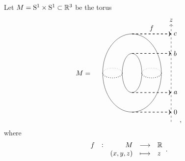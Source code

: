 \begin{example}
Let $ M = \mathrm{S}^1 \times \mathrm{S}^1 \subset \mathbb{R}^3 $ be the torus
$$
\begin{tikzpicture}
\draw (-2.5, 0) node{$ M = $};
\draw (0, 0) ellipse (1.5 and 2);
\draw (0, 0) ellipse (0.5 and 1);
\draw [dotted, thick] (-1.5, 0) arc (-180:0:0.5 and 0.25);
\draw [dotted, thick] (0.5, 0) arc (-180:0:0.5 and 0.25);
\draw [dotted] (-1.5, 0) arc (180:0:0.5 and 0.25);
\draw [dotted] (0.5, 0) arc (180:0:0.5 and 0.25);
\draw [->, dashed] (2, -2.5) to (2, 2.5) node[above]{$ z $};
\draw (1, 2) node[above]{$ f $};
\draw [->, dashed, thick] (0, -2) to (2, -2) node[right]{$ 0 $};
\draw [->, dashed, thick] (0, -1) to (2, -1) node[right]{$ a $};
\draw [->, dashed, thick] (0, 1) to (2, 1) node[right]{$ b $};
\draw [->, dashed, thick] (0, 2) to (2, 2) node[right]{$ c $};
\end{tikzpicture},
$$
where
$$ \function[f]{M}{\RR}{\br{x, y, z}}{z}. $$

\pagebreak


\end{example}
